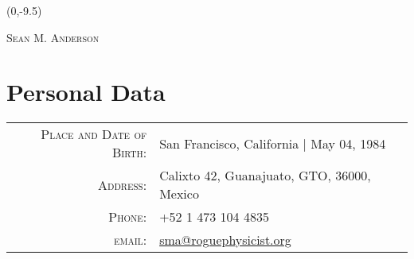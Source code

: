 \documentclass[letterpaper,10pt]{article}
\begin{document}
\begin{textblock}{1}(0,-9.5)
\end{textblock}

\begin{center}
{\Huge \textsc{Sean M. Anderson}}\\[5pt]
{\Large\color{headings}}
\end{center}

\section{Personal Data}
\begin{tabular}{rl}
\textsc{Place and Date of Birth:}	&	San Francisco, California | May 04, 1984 \\
\textsc{Address:}					&	Calixto 42, Guanajuato, GTO, 36000, Mexico \\
\textsc{Phone:}						&	+52 1 473 104 4835\\
\textsc{email:}						&	\href{mailto:sma@roguephysicist.org}{sma@roguephysicist.org}
\end{tabular}
\end{document}
